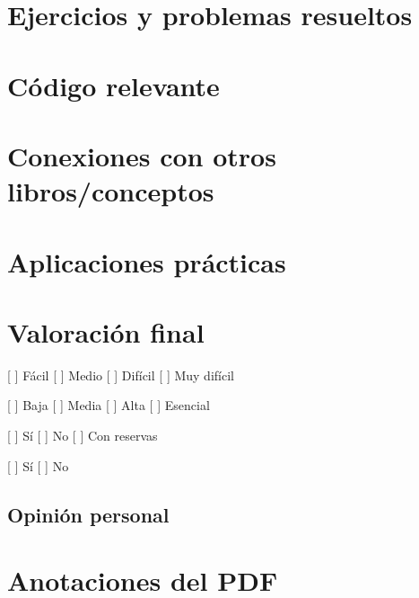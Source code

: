 \section{Ejercicios y problemas resueltos}\label{ejercicios-y-problemas-resueltos}

\section{Código relevante}\label{cuxf3digo-relevante}

\begin{Shaded}
\begin{Highlighting}[]
\end{Highlighting}
\end{Shaded}

\section{Conexiones con otros libros/conceptos}\label{conexiones-con-otros-librosconceptos}

\section{Aplicaciones prácticas}\label{aplicaciones-pruxe1cticas}

\section{Valoración final}\label{valoraciuxf3n-final}

\begin{description}
\tightlist
\item[Dificultad]
{[} {]} Fácil {[} {]} Medio {[} {]} Difícil {[} {]} Muy difícil
\item[Utilidad]
{[} {]} Baja {[} {]} Media {[} {]} Alta {[} {]} Esencial
\item[Recomendaría]
{[} {]} Sí {[} {]} No {[} {]} Con reservas
\item[Releer]
{[} {]} Sí {[} {]} No
\end{description}

\subsection{Opinión personal}\label{opiniuxf3n-personal}

\section{Anotaciones del PDF}\label{anotaciones-del-pdf}

